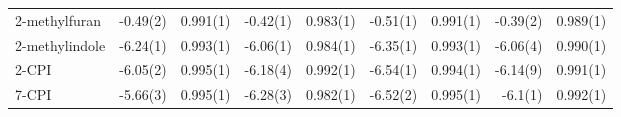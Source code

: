 \documentclass[journal=jctcce,manuscript=article]{achemso}
\begin{document}
\begin{table}[]
{\begin{minipage}{\linewidth}
{\begin{tabular}{llrrrrrrr}
        2-methylfuran  &
        -0.49(2) & 0.991(1) &
        -0.42(1) & 0.983(1) &
        -0.51(1) & 0.991(1) &
        -0.39(2) & 0.989(1) \\
        2-methylindole  &
        -6.24(1) & 0.993(1) &
        -6.06(1) & 0.984(1) &
        -6.35(1) & 0.993(1) &
        -6.06(4) & 0.990(1) \\
        2-CPI  &
        -6.05(2) & 0.995(1) &
        -6.18(4) & 0.992(1) &
        -6.54(1) & 0.994(1) &
        -6.14(9) & 0.991(1) \\
        7-CPI  &
        -5.66(3) & 0.995(1) &
        -6.28(3) & 0.982(1) &
        -6.52(2) & 0.995(1) &
        -6.1(1) & 0.992(1) \\
     \bottomrule
      \end{tabular}
    }
  \end{minipage}
}
\end{table}
\end{document}
